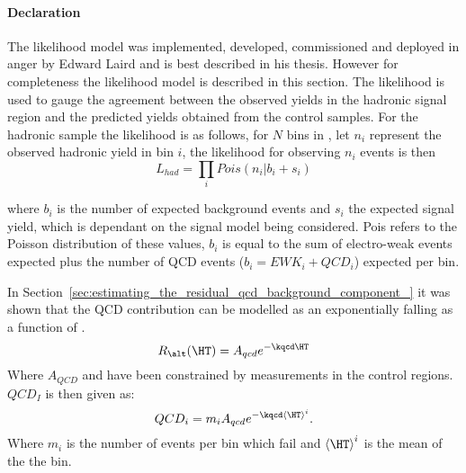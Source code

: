 \paragraph{Declaration} %
\label{par:declaration-likelihood}
The likelihood model was implemented, developed, commissioned and deployed in 
anger by Edward Laird and is best described in his thesis\cite{ted}. However 
for completeness the likelihood model is described in this section.
The likelihood is used to gauge the agreement between the observed yields in 
the hadronic signal region and the predicted yields obtained from the control 
samples.
For the hadronic sample the likelihood is as follows, for $N$ bins in \HT, let 
$n_{i}$ represent the observed hadronic yield in \HT bin $i$, the likelihood 
for observing $n_{i}$ events is then
\begin{equation}
  L_{had} = \prod_{i}Pois\left(n_{i}|b_{i}+s_{i}\right)
\label{eqn:l_had}
\end{equation}

where $b_{i}$ is the number of expected background events and $s_{i}$ the 
expected signal yield, which is dependant on the signal model being considered.
Pois refers to the Poisson distribution of these values, $b_{i}$ is equal to 
the sum of electro-weak events expected plus the number of QCD events ($b_{i} = 
EWK_{i}+QCD_{i}$) expected per bin.

In Section~\ref{sec:estimating_the_residual_qcd_background_component_} it was 
shown that the QCD contribution can be modelled as an exponentially falling as 
a function of \HT.
\begin{equation}
  R_{\alt}(\HT) = A_{qcd}e^{-\kqcd \HT}
\end{equation}
Where $A_{QCD}$ and \kqcd have been constrained by measurements in the control regions. $QCD_{I}$ is then given as:
\begin{equation}
  QCD_{i} = m_{i}A_{qcd}e^{-\kqcd \left<\HT\right>^{i}}.
  \label{eqn:qcdi}
\end{equation}
Where $m_{i}$ is the number of events per \HT bin which fail \altg and $\left<\HT\right>^{i}$ is the mean \HT of the the bin.


